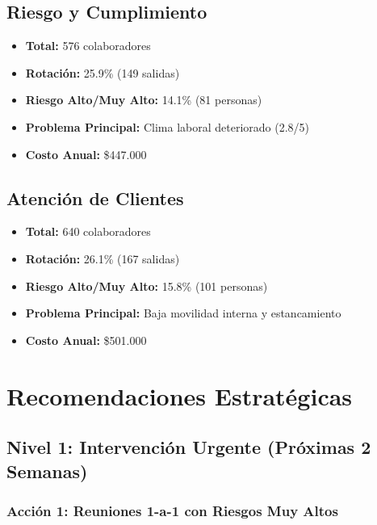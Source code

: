 \documentclass[11pt,a4paper,twoside]{article}
\begin{document}
\subsection{Riesgo y Cumplimiento}

\begin{itemize}
    \item \textbf{Total:} 576 colaboradores
    \item \textbf{Rotación:} 25.9\% (149 salidas)
    \item \textbf{Riesgo Alto/Muy Alto:} 14.1\% (81 personas)
    \item \textbf{Problema Principal:} Clima laboral deteriorado (2.8/5)
    \item \textbf{Costo Anual:} \$447.000
\end{itemize}

\subsection{Atención de Clientes}

\begin{itemize}
    \item \textbf{Total:} 640 colaboradores
    \item \textbf{Rotación:} 26.1\% (167 salidas)
    \item \textbf{Riesgo Alto/Muy Alto:} 15.8\% (101 personas)
    \item \textbf{Problema Principal:} Baja movilidad interna y estancamiento
    \item \textbf{Costo Anual:} \$501.000
\end{itemize}

\newpage

\section{Recomendaciones Estratégicas}

\subsection{Nivel 1: Intervención Urgente (Próximas 2 Semanas)}

\subsubsection{Acción 1: Reuniones 1-a-1 con Riesgos Muy Altos}
\end{document}
